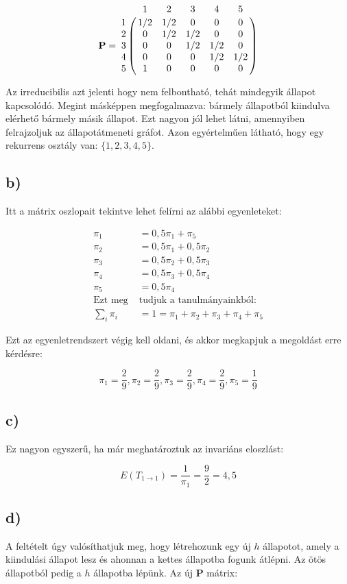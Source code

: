\documentclass[a4paper,12pt]{article}   		%
\begin{document}
\[
\mathbf{P} = 
\bordermatrix{
~	&	1	&	2	&	3	&	4	&	5	\cr
1	&	1/2	&	1/2	&	0	&	0	&	0	\cr
2	&	0	&	1/2	&	1/2	&	0	&	0	\cr
3	&	0	&	0	&	1/2	&	1/2	&	0	\cr
4	&	0	&	0	&	0	&	1/2	&	1/2	\cr
5	&	1	&	0	&	0	&	0	&	0}
\]

Az irreducibilis azt jelenti hogy nem felbontható, tehát mindegyik 
állapot kapcsolódó. Megint másképpen megfogalmazva: bármely 
állapotból kiindulva elérhető bármely másik állapot. Ezt nagyon jól
lehet látni, amennyiben felrajzoljuk az állapotátmeneti gráfot.
Azon egyértelműen látható, hogy egy rekurrens osztály van:
$\{1, 2, 3, 4, 5\}$.

\subsection*{b)}
Itt a mátrix oszlopait tekintve lehet felírni az alábbi egyenleteket:

\begin{align*}
\pi_1 &= 0,5 \pi_1 + \pi_5 \\
\pi_2 &= 0,5 \pi_1 + 0,5 \pi_2 \\
\pi_3 &= 0,5 \pi_2 + 0,5 \pi_3 \\
\pi_4 &= 0,5 \pi_3 + 0,5 \pi_4 \\
\pi_5 &= 0,5 \pi_4 \\
\text{Ezt meg } &\text{tudjuk a tanulmányainkból:} \\
\sum_{i} \pi_i &= 1 = \pi_1 + \pi_2 + \pi_3 + \pi_4 + \pi_5
\end{align*}

Ezt az egyenletrendszert végig kell oldani, és akkor megkapjuk a
megoldást erre kérdésre:

\[
\pi_1 = \frac{2}{9},
\pi_2 = \frac{2}{9},
\pi_3 = \frac{2}{9},
\pi_4 = \frac{2}{9},
\pi_5 = \frac{1}{9}
\]

\subsection*{c)}
Ez nagyon egyszerű, ha már meghatároztuk az invariáns eloszlást:

\[
E(T_{1\to1}) = \frac{1}{\pi_1} = \frac{9}{2} = 4,5
\]

\subsection*{d)}
A feltételt úgy valósíthatjuk meg, hogy létrehozunk egy új $h$
állapotot, amely a kiindulási állapot lesz és ahonnan a kettes
állapotba fogunk átlépni. Az ötös állapotból pedig a $h$ állapotba 
lépünk. Az új $\mathbf{P}$ mátrix:
\end{document}
